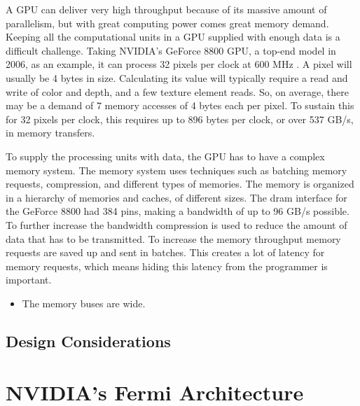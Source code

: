 \documentclass[../main/report.tex]{subfiles}
\begin{document}
A GPU can deliver very high throughput because of its massive amount of parallelism, but with great computing power comes great memory demand.
Keeping all the computational units in a GPU supplied with enough data is a difficult challenge.
Taking NVIDIA's GeForce 8800 GPU, a top-end model in 2006, as an example, it can process 32 pixels per clock at 600 MHz \cite{gpu_appendix}.
A pixel will usually be 4 bytes in size.
Calculating its value will typically require a read and write of color and depth, and a few texture element reads.
So, on average, there may be a demand of 7 memory accesses of 4 bytes each per pixel.
To sustain this for 32 pixels per clock, this requires up to 896 bytes per clock, or over 537 GB/s, in memory transfers.

To supply the processing units with data, the GPU has to have a complex memory system. 
The memory system uses techniques such as batching memory requests, compression, and different types of memories.
The memory is organized in a hierarchy of memories and caches, of different sizes.
The dram interface for the GeForce 8800 had 384 pins, making a bandwidth of up to 96 GB/s possible.
To further increase the bandwidth compression is used to reduce the amount of data that has to be transmitted.
To increase the memory throughput memory requests are saved up and sent in batches.
This creates a lot of latency for memory requests, which means hiding this latency from the programmer is important.
 
\begin{itemize}
	\item The memory buses are wide.
\end{itemize}


\subsection{Design Considerations}


\section{NVIDIA's Fermi Architecture} %
\end{document}
